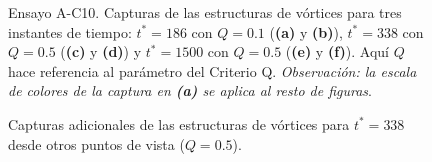 \begin{figure}
  \caption{Ensayo A-C10. Capturas de las estructuras de vórtices para tres instantes de tiempo: $t^* =186$ con $Q=0\text{.}1$ (\textbf{(a)} y \textbf{(b)}), $t^* =338$ con $Q=0\text{.}5$ (\textbf{(c)} y \textbf{(d)}) y $t^* = 1500$ con $Q=0\text{.}5$ (\textbf{(e)} y \textbf{(f)}). Aquí $Q$ hace referencia al parámetro del Criterio Q. \textit{Observación: la escala de colores de la captura en \textbf{(a)} se aplica al resto de figuras}.}
  \label{fig:mosaico2-ac10}
\end{figure}

\begin{figure}%
  \centering  
  \caption{Capturas adicionales de las estructuras de vórtices para $t^* =338$ desde otros puntos de vista ($Q=0\text{.}5$).}
  \label{fig:mosaico-ac10-v1-v2}
\end{figure}

